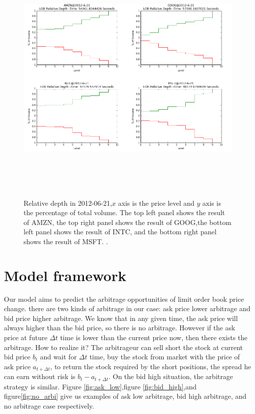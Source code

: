 \begin{figure}[hbtp]
  \begin{center}
    \includegraphics[width=6in,height=5in]{figures/depth.png}
  \end{center}
\caption{Relative depth in 2012-06-21,$x$ axis is the price level and $y$ axis is the percentage of total volume. The top left panel shows the result of AMZN, the top right panel shows the result of GOOG,the bottom left panel shows the result of INTC, and the bottom right panel shows the result of MSFT. . } \label{fig:depth}
\end{figure}

\section{Model framework}
Our model aims to predict the arbitrage opportunities of limit order book price change. there are two kinds of arbitrage in our case: ask price lower arbitrage and bid price higher arbitrage. We know that in any given time, the ask price will always higher than the bid price, so there is no arbitrage. However if the ask price at future $\Delta t$ time is lower than the current price now, then there exists the arbitrage. How to realize it? The arbitrageur can sell short the stock at current bid price $b_t $ and wait for $\Delta t$ time, buy the stock from market with the price of ask price $a_{t+\Delta t}$, to return the stock required by the short positions, the spread he can earn without risk is $b_t-a_{t+\Delta t}$. On the bid high situation, the arbitrage strategy is similar. Figure \ref{fig:ask_low},figure \ref{fig:bid_high},and figure\ref{fig:no_arbi} give us examples of ask low arbitrage, bid high arbitrage, and no arbitrage case respectively.

